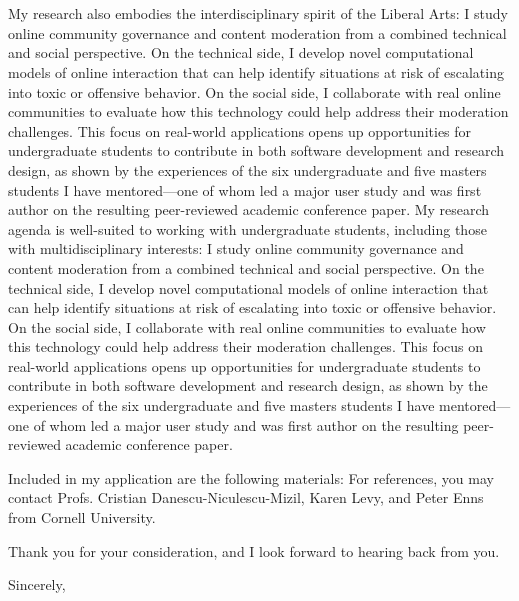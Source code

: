 \documentclass[12pt]{letter}
\begin{document}
\begin{letter}{
\department \\
\schoolnamelong \\
\schooladdress
}
\ifliberalarts
My research also embodies the interdisciplinary spirit of the Liberal Arts: I study online community governance and content moderation from a combined technical and social perspective.
On the technical side, I develop novel computational models of online interaction that can help identify situations at risk of escalating into toxic or offensive behavior.
On the social side, I collaborate with real online communities to evaluate how this technology could help address their moderation challenges.
This focus on real-world applications opens up opportunities for undergraduate students to contribute in both software development and research design, as shown by the experiences of the six undergraduate and five masters students I have mentored---one of whom led a major user study and was first author on the resulting peer-reviewed academic conference paper.
\else
My research agenda is well-suited to working with undergraduate students, including those with multidisciplinary interests: I study online community governance and content moderation from a combined technical and social perspective.
On the technical side, I develop novel computational models of online interaction that can help identify situations at risk of escalating into toxic or offensive behavior.
On the social side, I collaborate with real online communities to evaluate how this technology could help address their moderation challenges.
This focus on real-world applications opens up opportunities for undergraduate students to contribute in both software development and research design, as shown by the experiences of the six undergraduate and five masters students I have mentored---one of whom led a major user study and was first author on the resulting peer-reviewed academic conference paper.
\fi
\coverresearchpara

Included in my application are the following materials: \materials
For references, you may contact Profs. Cristian Danescu-Niculescu-Mizil, Karen Levy, and Peter Enns from Cornell University.

Thank you for your consideration, and I look forward to hearing back from you.

\closing{Sincerely,}

\end{letter}
\end{document}
